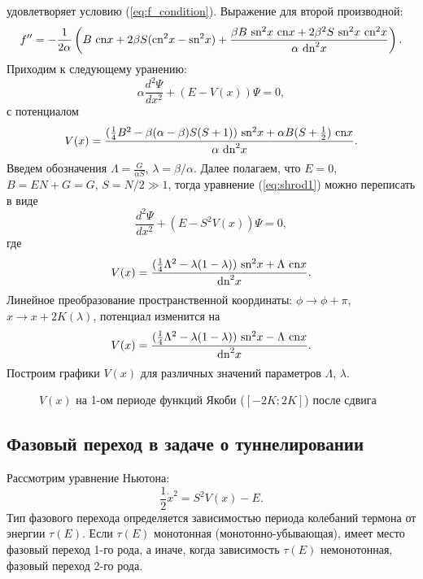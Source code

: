 \documentclass[12pt]{article}
\begin{document}
%
удовлетворяет условию (\ref{eq:f_condition}).
Выражение для второй производной:
%
$$f'' = -\frac{1}{2 \alpha} \left( B~\textrm{cn} x + 2\beta S (\textrm{cn}^2 x - \textrm{sn}^2 x) + \frac{\beta B~\textrm{sn}^2 x~\textrm{cn} x + 2 \beta^2 S~\textrm{sn}^2 x~\textrm{cn}^2 x}{\alpha~\textrm{dn}^2 x} \right).$$
%
Приходим к следующему уранению:
%
\begin{equation}
\alpha \frac{d^2 \Psi}{dx^2} + (E - V(x)) \Psi = 0,
\label{eq:shrod1}
\end{equation}
%
с потенциалом
%
\begin{equation}
V(x) = \frac{(\frac{1}{4}B^2 - \beta(\alpha - \beta) S (S+1))~\textrm{sn}^2 x + \alpha B (S + \frac{1}{2})~\textrm{cn} x}{\alpha~\textrm{dn}^2 x}.
\end{equation}
%
Введем обозначения $\Lambda = \frac{G}{\alpha S}$, $\lambda = \beta / \alpha$.
Далее полагаем, что $E = 0$, $B = EN + G = G$, $S = N/2 \gg 1$, тогда уравнение (\ref{eq:shrod1}) можно переписать в виде
%
\begin{equation}
\frac{d^2 \Psi}{dx^2} + (E - S^2 V(x)) \Psi = 0,
\label{eq:shrod2}
\end{equation}
% 
где
%
\begin{equation}
V(x) = \frac{(\frac{1}{4} \Lambda^2 - \lambda (1 - \lambda))~\textrm{sn}^2 x + \Lambda~\textrm{cn} x}{\textrm{dn}^2 x}.
\end{equation}
%
Линейное преобразование пространственной координаты: $\phi \to \phi + \pi$, $x \to x + 2K(\lambda)$, потенциал изменится на
%
\begin{equation}
V(x) = \frac{(\frac{1}{4} \Lambda^2 - \lambda (1 - \lambda))~\textrm{sn}^2 x - \Lambda~\textrm{cn} x}{\textrm{dn}^2 x}.
\end{equation}
%
Построим графики $V(x)$ для различных значений параметров $\Lambda$, $\lambda$.
%
\begin{figure}[Ht!]
\caption{$V(x)$ на 1-ом периоде функций Якоби ($[-2K; 2K]$) после сдвига}
\end{figure}
%
%

\subsection*{Фазовый переход в задаче о туннелировании}

Рассмотрим уравнение Ньютона:
%
\begin{equation}
\frac{1}{2} \dot{x}^2 = S^2 V(x) - E.
\label{eq:newton}
\end{equation}
%
Тип фазового перехода определяется зависимостью периода колебаний термона от энергии $\tau(E)$.
Если $\tau(E)$ монотонная (монотонно-убывающая), имеет место фазовый переход 1-го рода, а иначе, когда зависимость $\tau(E)$ немонотонная, фазовый переход 2-го рода.
\end{document}

